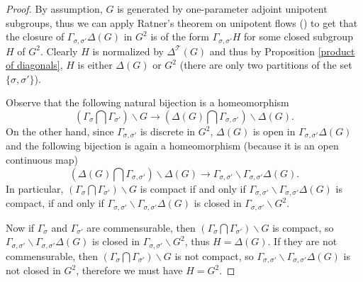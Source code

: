 \documentclass[11pt,oneside,reqno]{amsart}
\theoremstyle{plain}
\begin{document}
	\begin{proof}
		By assumption, $G$ is generated by one-parameter adjoint unipotent subgroups, thus we can apply Ratner's theorem on unipotent flows (\cite[Theorem 2]{Ratner1995}) to get that the closure of $\Gamma_{\sigma,\sigma'}\Delta(G)$ in $G^2$ is of the form $\Gamma_{\sigma,\sigma'}H$ for some closed subgroup $H$ of $G^2$. Clearly $H$ is normalized by $\Delta^{\mathcal{T}}(G)$ and thus by Proposition \ref{product of diagonals}, $H$ is either $\Delta(G)$ or $G^2$ (there are only two partitions of the set $\{\sigma,\sigma'\}$).
		
		
		Observe that the following natural bijection is a homeomorphism
		\[
		\left(
		\Gamma_{\sigma}\bigcap\Gamma_{\sigma'}
		\right)
		\backslash G
		\rightarrow
		\left(
		\Delta(G)\bigcap\Gamma_{\sigma,\sigma'}
		\right)
		\backslash\Delta(G).
		\]
		On the other hand, since $\Gamma_{\sigma,\sigma'}$ is discrete in $G^2$, $\Delta(G)$ is open in $\Gamma_{\sigma,\sigma'}\Delta(G)$ and the following bijection is again a homeomorphism (because it is an open continuous map)
		\[
		\left(
		\Delta(G)\bigcap\Gamma_{\sigma,\sigma'}
		\right)
		\backslash\Delta(G)
		\rightarrow
		\Gamma_{\sigma,\sigma'}\backslash\Gamma_{\sigma,\sigma'}\Delta(G).
		\]
		In particular, $(\Gamma_{\sigma}\bigcap\Gamma_{\sigma'})\backslash G$ is compact if and only if
		$\Gamma_{\sigma,\sigma'}\backslash\Gamma_{\sigma,\sigma'}\Delta(G)$ is compact, if and only if
		$\Gamma_{\sigma,\sigma'}\backslash\Gamma_{\sigma,\sigma'}\Delta(G)$ is closed in 
		$\Gamma_{\sigma,\sigma'}\backslash G^2$.
		
		
		
		
		Now if $\Gamma_{\sigma}$ and $\Gamma_{\sigma'}$ are commensurable, then $(\Gamma_{\sigma}\bigcap\Gamma_{\sigma'})\backslash G$ is compact, so $\Gamma_{\sigma,\sigma'}\backslash\Gamma_{\sigma,\sigma'}\Delta(G)$ is closed in 
		$\Gamma_{\sigma,\sigma'}\backslash G^2$, thus $H=\Delta(G)$.
		If they are not commensurable, then $(\Gamma_{\sigma}\bigcap\Gamma_{\sigma'})\backslash G$ is not compact, so $\Gamma_{\sigma,\sigma'}\backslash\Gamma_{\sigma,\sigma'}\Delta(G)$ is not closed in $G^2$, therefore we must have $H=G^2$.
	\end{proof}
	
	
	
	
	
	
	
\end{document}
